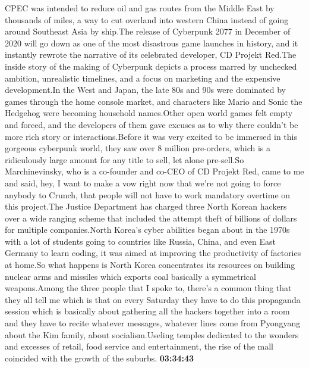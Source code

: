 \documentclass{article}%
\begin{document}
CPEC was intended to reduce oil and gas routes from the Middle East by thousands of miles, a way to cut overland into western China instead of going around Southeast Asia by ship.The release of Cyberpunk 2077 in December of 2020 will go down as one of the most disastrous game launches in history, and it instantly rewrote the narrative of its celebrated developer, CD Projekt Red.The inside story of the making of Cyberpunk depicts a process marred by unchecked ambition, unrealistic timelines, and a focus on marketing and the expensive development.In the West and Japan, the late 80s and 90s were dominated by games through the home console market, and characters like Mario and Sonic the Hedgehog were becoming household names.Other open world games felt empty and forced, and the developers of them gave excuses as to why there couldn't be more rich story or interactions.Before it was very excited to be immersed in this gorgeous cyberpunk world, they saw over 8 million pre{-}orders, which is a ridiculously large amount for any title to sell, let alone pre{-}sell.So Marchinevinsky, who is a co{-}founder and co{-}CEO of CD Projekt Red, came to me and said, hey, I want to make a vow right now that we're not going to force anybody to Crunch, that people will not have to work mandatory overtime on this project.The Justice Department has charged three North Korean hackers over a wide ranging scheme that included the attempt theft of billions of dollars for multiple companies.North Korea's cyber abilities began about in the 1970s with a lot of students going to countries like Russia, China, and even East Germany to learn coding, it was aimed at improving the productivity of factories at home.So what happens is North Korea concentrates its resources on building nuclear arms and missiles which exports coal basically a symmetrical weapons.Among the three people that I spoke to, there's a common thing that they all tell me which is that on every Saturday they have to do this propaganda session which is basically about gathering all the hackers together into a room and they have to recite whatever messages, whatever lines come from Pyongyang about the Kim family, about socialism.Useling temples dedicated to the wonders and excesses of retail, food service and entertainment, the rise of the mall coincided with the growth of the suburbs.%
\textbf{03:34:43}%
\newline%
\end{document}
